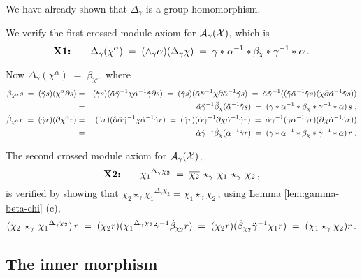 \begin{pf}
We have already shown that  $\Delta_{\gamma}$  is a group homomorphism.

\medskip\noindent
We verify the first crossed module axiom for  $\mathcal{A}_{\gamma}(\mathcal{X})$, which is 
$$
\mbox{\textbf{X1:}} \quad\quad
\Delta_{\gamma}(\chi^{\alpha}) 
 \;=\;  (\wedge_{\gamma} \alpha)(\Delta_{\gamma}\chi) 
 \;=\;  \gamma*\alpha^{-1}*\beta_{\chi}*\gamma^{-1}*\alpha\,.
$$

\noindent
Now $\Delta_{\gamma}(\chi^{\alpha}) \;=\; \beta_{\chi^{\alpha}}\,$ where 
\begin{eqnarray*} 
\ddot{\beta}_{\chi^{\alpha}} s \;=\; (\ddot{\gamma} s)(\chi^{\alpha} \partial s)
  & = & 
    (\ddot{\gamma} s)(\ddot{\alpha}\ddot{\gamma}^{-1}\chi\dot{\alpha}^{-1}\dot{\gamma}\partial s)
  \;=\;
    (\ddot{\gamma} s)(\ddot{\alpha}\ddot{\gamma}^{-1}\chi\partial\ddot{\alpha}^{-1}\ddot{\gamma} s)
  \;=\;
    \ddot{\alpha}\ddot{\gamma}^{-1}((\ddot{\gamma}\ddot{\alpha}^{-1}\ddot{\gamma} s)(\chi\partial\ddot{\alpha}^{-1}\ddot{\gamma} s)) \\
  & = &
    \ddot{\alpha}\ddot{\gamma}^{-1}\ddot{\beta}_{\chi}(\ddot{\alpha}^{-1}\ddot{\gamma} s)
  \;=\;
    (\gamma * \alpha^{-1} * \beta_{\chi} * \gamma^{-1} * \alpha) \, s ~, \\
\dot{\beta}_{\chi^{\alpha}} r \;=\; (\dot{\gamma} r)(\partial \chi^{\alpha} r)
  & = &
    (\dot{\gamma} r)(\partial \ddot{\alpha} \ddot{\gamma}^{-1} \chi \dot{\alpha}^{-1} \dot{\gamma} r)
  \;=\;
    (\dot{\gamma} r)(\dot{\alpha} \dot{\gamma}^{-1} \partial \chi \dot{\alpha}^{-1} \dot{\gamma} r)
  \;=\;
    \dot{\alpha} \dot{\gamma}^{-1} (\dot{\gamma} \dot{\alpha}^{-1} \dot{\gamma} r) (\partial \chi \dot{\alpha}^{-1} \dot{\gamma} r) ) \\
  & = &
    \dot{\alpha} \dot{\gamma}^{-1} \dot{\beta}_{\chi}(\dot{\alpha}^{-1} \dot{\gamma} r)
  \;=\;
    (\gamma * \alpha^{-1} * \beta_{\chi} * \gamma^{-1} * \alpha) \, r ~. 
\end{eqnarray*}

\noindent
The second crossed module axiom for  $\mathcal{A}_{\gamma}(\mathcal{X})$, 
$$
\mbox{\textbf{X2:}} \quad\quad
{\chi_1}^{\Delta_{\gamma} \chi_2} \;=\;
  \overline{\chi_2} \,\star_{\gamma}\, \chi_1 \,\star_{\gamma}\, \chi_2\,,
$$
is verified by showing that 
$\chi_2 \star_{\gamma} {\chi_1}^{\Delta_{\gamma}\chi_2} 
 = \chi_1 \star_{\gamma} \chi_2$\,, 
using Lemma \ref{lem:gamma-beta-chi} (c), 
$$
(\chi_2 \,\star_{\gamma}\,{\chi_1}^{\Delta_{\gamma} \chi_2})\,r 
  \;=\; (\chi_2 r)({\chi_1}^{\Delta_{\gamma}\chi_2}\dot{\gamma}^{-1}\dot{\beta}_{\chi_2}r)
  \;=\; (\chi_2 r)(\ddot{\beta}_{\chi_2} \ddot{\gamma}^{-1} \chi_1 r)
  \;=\; (\chi_1 \star_{\gamma} \chi_2)r\,. 
$$ 
\end{pf}



\subsection{The inner morphism}
\label{subs:inner-morphism}


